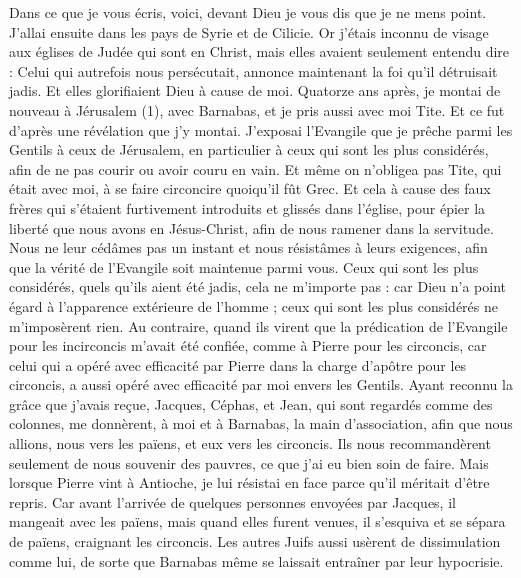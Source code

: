 \begin{multicols}{2}
Dans ce que je vous écris, voici, devant Dieu je vous dis que je ne mens point.
J'allai ensuite dans les pays de Syrie et de Cilicie.
Or j'étais inconnu de visage aux églises de Judée qui sont en Christ,
mais elles avaient seulement entendu dire : Celui qui autrefois nous persécutait, annonce maintenant la foi qu'il détruisait jadis.
Et elles glorifiaient Dieu à cause de moi.
\VerseOne{}Quatorze ans après, je montai de nouveau à Jérusalem (1), avec Barnabas, et je pris aussi avec moi Tite.
Et ce fut d’après une révélation que j'y montai. J’exposai l'Evangile que je prêche parmi les Gentils à ceux de Jérusalem, en particulier à ceux qui sont les plus considérés, afin de ne pas courir ou avoir couru en vain.
Et même on n’obligea pas Tite, qui était avec moi, à se faire circoncire quoiqu’il fût Grec.
Et cela à cause des faux frères qui s’étaient furtivement introduits et glissés dans l'église, pour épier la liberté que nous avons en Jésus-Christ, afin de nous ramener dans la servitude.
Nous ne leur cédâmes pas un instant et nous résistâmes à leurs exigences, afin que la vérité de l'Evangile soit maintenue parmi vous.
Ceux qui sont les plus considérés, quels qu’ils aient été jadis, cela ne m’importe pas : car Dieu n’a point égard à l’apparence extérieure de l’homme ; ceux qui sont les plus considérés ne m’imposèrent rien.
Au contraire, quand ils virent que la prédication de l'Evangile pour les incirconcis m’avait été confiée, comme à Pierre pour les circoncis,
car celui qui a opéré avec efficacité par Pierre dans la charge d’apôtre pour les circoncis, a aussi opéré avec efficacité par moi envers les Gentils.
Ayant reconnu la grâce que j'avais reçue, Jacques, Céphas, et Jean, qui sont regardés comme des colonnes, me donnèrent, à moi et à Barnabas, la main d'association, afin que nous allions, nous vers les païens, et eux vers les circoncis.
Ils nous recommandèrent seulement de nous souvenir des pauvres, ce que j’ai eu bien soin de faire.
Mais lorsque Pierre vint à Antioche, je lui résistai en face parce qu'il méritait d'être repris.
Car avant l’arrivée de quelques personnes envoyées par Jacques, il mangeait avec les païens, mais quand elles furent venues, il s’esquiva et se sépara de païens, craignant les circoncis.
Les autres Juifs aussi usèrent de dissimulation comme lui, de sorte que Barnabas même se laissait entraîner par leur hypocrisie.

\end{multicols}
